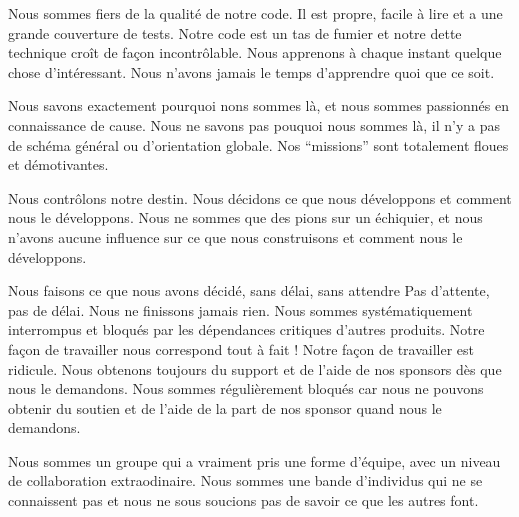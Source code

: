 \documentclass[a4paper]{article}
\begin{document}
  {Nous sommes fiers de la qualit\'e de notre code. Il est propre, facile à lire et a une grande couverture de tests.}
  {Notre code est un tas de fumier et notre dette technique croît de façon incontrôlable.}
  \clearpage
{}
  {Nous apprenons à chaque instant quelque chose d'int\'eressant.}
  {Nous n'avons jamais le temps d'apprendre quoi que ce soit.}
  
  \clearpage
{}
  {Nous savons exactement pourquoi nons sommes là, et nous sommes passionn\'es en connaissance de cause.}
  {Nous ne savons pas pouquoi nous sommes là, il n'y a pas de sch\'ema g\'en\'eral  ou d'orientation globale. Nos ``missions'' sont totalement floues et d\'emotivantes.}
%

\clearpage
%
 {Nous contrôlons notre destin. Nous d\'ecidons ce que nous d\'eveloppons et comment nous le d\'eveloppons.}
 {Nous ne sommes que des pions sur un \'echiquier, et nous n'avons aucune influence sur ce que nous construisons et comment nous le d\'eveloppons.}
 
 
 \clearpage
{}
  {Nous faisons ce que nous avons d\'ecid\'e, sans délai, sans attendre Pas d'attente, pas de d\'elai.}
  {Nous ne finissons jamais rien. Nous sommes syst\'ematiquement interrompus et bloqu\'es par les d\'ependances critiques d'autres produits.}
  \clearpage
{}
  {Notre façon de travailler nous correspond tout à fait !}
  {Notre façon de travailler est ridicule.}
%
\clearpage
{}
  {Nous obtenons toujours du support et de l'aide de nos sponsors dès que nous le demandons.}
  {Nous sommes r\'egulièrement bloqu\'es car nous ne pouvons obtenir du soutien et de l'aide de la part de nos sponsor quand nous le demandons.}
%

\clearpage

  {Nous sommes un groupe qui a vraiment pris une forme d'\'equipe, avec un niveau de collaboration extraodinaire.}
  {Nous sommes une bande d'individus qui ne se connaissent pas et nous ne sous soucions pas de savoir ce que les autres font.}
%



\restoregeometry
\end{document}
